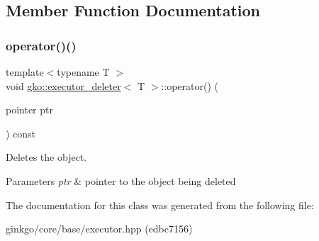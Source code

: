 \subsection{Member Function Documentation}
\mbox{\label{classgko_1_1executor__deleter_aaefa9d9f1c8ae4f4723668d5f946e5c0}} 
\subsubsection{\texorpdfstring{operator()()}{operator()()}}
{\footnotesize\ttfamily template$<$typename T $>$ \\
void \hyperlink{classgko_1_1executor__deleter}{gko\+::executor\+\_\+deleter}$<$ T $>$\+::operator() (\begin{DoxyParamCaption}\item[{pointer}]{ptr }\end{DoxyParamCaption}) const\hspace{0.3cm}{\ttfamily [inline]}}



Deletes the object. 


\begin{DoxyParams}{Parameters}
{\em ptr} & pointer to the object being deleted \\
\hline
\end{DoxyParams}


The documentation for this class was generated from the following file\+:\begin{DoxyCompactItemize}
\item 
ginkgo/core/base/executor.\+hpp (edbc7156)\end{DoxyCompactItemize}
